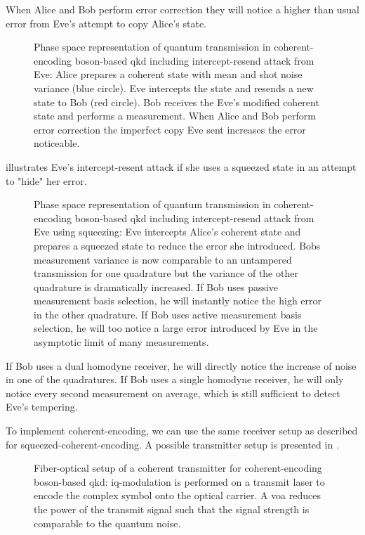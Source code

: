 When Alice and Bob perform error correction they will notice a higher than usual error from Eve's attempt to copy Alice's state.
\begin{figure}[htb]
	\centering
	
	\caption{Phase space representation of quantum transmission in coherent-encoding boson-based \gls{qkd} including intercept-resend attack from Eve: Alice prepares a coherent state with mean and shot noise variance (blue circle). Eve intercepts the state and resends a new state to Bob (red circle). Bob receives the Eve's modified coherent state and performs a measurement. When Alice and Bob perform error correction the imperfect copy Eve sent increases the error noticeable.}\label{fig:phase_space_intercept_resend}
\end{figure}
 illustrates Eve's intercept-resent attack if she uses a squeezed state in an attempt to "hide" her error.
\begin{figure}[htb]
	\centering
	
	\caption{Phase space representation of quantum transmission in coherent-encoding boson-based \gls{qkd} including intercept-resend attack from Eve using squeezing: Eve intercepts Alice's coherent state and prepares a squeezed state to reduce the error she introduced. Bobs measurement variance is now comparable to an untampered transmission for one quadrature but the variance of the other quadrature is dramatically increased. If Bob uses passive measurement basis selection, he will instantly notice the high error in the other quadrature. If Bob uses active measurement basis selection, he will too notice a large error introduced by Eve in the asymptotic limit of many measurements.}\label{fig:phase_space_intercept_resend_squeezed}
\end{figure}
If Bob uses a dual homodyne receiver, he will directly notice the increase of noise in one of the quadratures.
If Bob uses a single homodyne receiver, he will only notice every second measurement on average, which is still sufficient to detect Eve's tempering.

To implement coherent-encoding, we can use the same receiver setup as described for squeezed-coherent-encoding.
A possible transmitter setup is presented in \label{fig:coherent_transmitter}.
\begin{figure}[htb]
	\centering
	
	\caption{Fiber-optical setup of a coherent transmitter for coherent-encoding boson-based \gls{qkd}: \gls{iq}-modulation is performed on a transmit laser to encode the complex symbol onto the optical carrier. A \gls{voa} reduces the power of the transmit signal such that the signal strength is comparable to the quantum noise.}\label{fig:coherent_transmitter}
\end{figure}